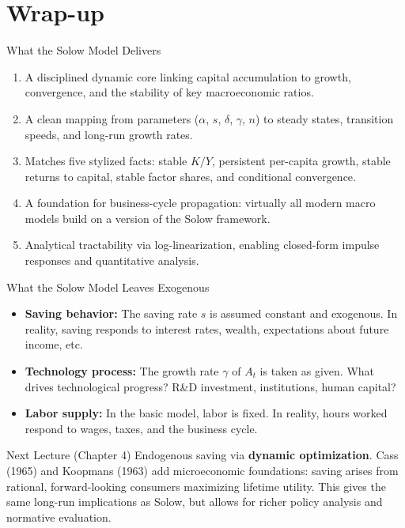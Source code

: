 \documentclass[aspectratio=169,10pt]{beamer}
\begin{document}
\section{Wrap-up}

\begin{frame}{What the Solow Model Delivers}
\begin{enumerate}
  \item A disciplined dynamic core linking capital accumulation to growth, convergence, and the stability of key macroeconomic ratios.
  \item A clean mapping from parameters ($\alpha$, $s$, $\delta$, $\gamma$, $n$) to steady states, transition speeds, and long-run growth rates.
  \item Matches five stylized facts: stable $K/Y$, persistent per-capita growth, stable returns to capital, stable factor shares, and conditional convergence.
  \item A foundation for business-cycle propagation: virtually all modern macro models build on a version of the Solow framework.
  \item Analytical tractability via log-linearization, enabling closed-form impulse responses and quantitative analysis.
\end{enumerate}
\end{frame}

\begin{frame}{What the Solow Model Leaves Exogenous}
\begin{itemize}
  \item \textbf{Saving behavior:} The saving rate $s$ is assumed constant and exogenous. In reality, saving responds to interest rates, wealth, expectations about future income, etc.
  \item \textbf{Technology process:} The growth rate $\gamma$ of $A_t$ is taken as given. What drives technological progress? R\&D investment, institutions, human capital?
  \item \textbf{Labor supply:} In the basic model, labor is fixed. In reality, hours worked respond to wages, taxes, and the business cycle.
\end{itemize}

\begin{block}{Next Lecture (Chapter 4)}
Endogenous saving via \textbf{dynamic optimization}. Cass (1965) and Koopmans (1963) add microeconomic foundations: saving arises from rational, forward-looking consumers maximizing lifetime utility. This gives the same long-run implications as Solow, but allows for richer policy analysis and normative evaluation.
\end{block}
\end{frame}
\end{document}

